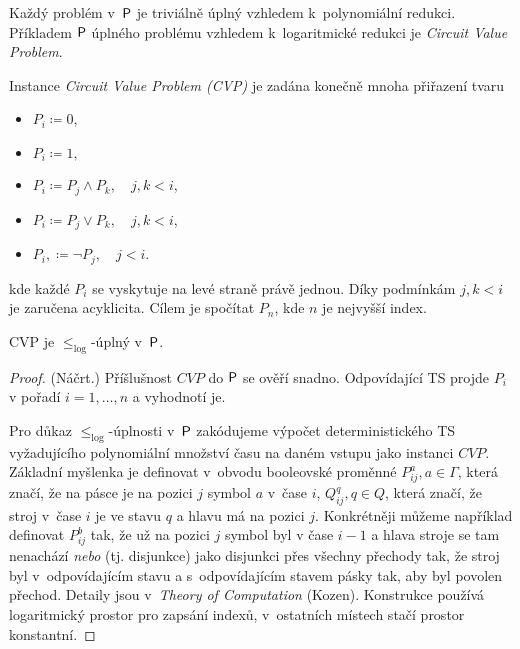 Každý problém v~$\P$ je triviálně úplný vzhledem k~polynomiální redukci.
Příkladem $\P$ úplného problému vzhledem k~logaritmické redukci je
{\em Circuit Value Problem}.

\begin{definition}
    Instance {\em Circuit Value Problem (CVP)}
    je zadána konečně mnoha přiřazení tvaru
    \begin{itemize}
        \item $P_i \coloneqq 0$,
        \item $P_i \coloneqq 1,$
        \item $P_i \coloneqq P_j \land P_k, \quad j, k < i$,
        \item $P_i \coloneqq P_j \lor P_k, \quad j, k < i$,
        \item $P_i, \coloneqq \neg P_j, \quad j < i$.
    \end{itemize}
    kde každé $P_i$ se vyskytuje na levé straně právě jednou. Díky
    podmínkám $j,k < i$ je zaručena acyklicita. Cílem je spočítat $P_n$,
    kde $n$ je nejvyšší index.
\end{definition}

\begin{theorem}
    CVP je $\leq_{\log}$-úplný v~$\P$.
\end{theorem}

\begin{proof} (Náčrt.)
    Příšlušnost $CVP$ do $\P$ se ověří snadno. Odpovídající TS projde
    $P_i$ v pořadí $i = 1,\ldots,n$ a vyhodnotí je.

    Pro důkaz $\leq_{\log}$-úplnosti v~$\P$ zakódujeme výpočet
    deterministického TS vyžadujícího polynomiální množství času na
    daném vstupu jako instanci $CVP$.
    Základní myšlenka je definovat v~obvodu booleovské proměnné
    $P^{a}_{ij}, a \in \Gamma$, která značí, že na pásce je na pozici
    $j$ symbol $a$ v~čase $i$,
    $Q^q_{ij}, q \in Q$, která značí, že stroj v~čase $i$ je ve stavu $q$
    a hlavu má na pozici $j$.
    Konkrétněji můžeme například definovat $P^{b}_{ij}$ tak,
    že už na pozici $j$ symbol byl v čase $i-1$ a hlava stroje se tam
    nenachází {\em nebo} (tj. disjunkce)
    jako disjunkci přes všechny přechody tak, že stroj byl
    v~odpovídajícím stavu a s~odpovídajícím stavem pásky tak, aby byl
    povolen přechod.
    Detaily jsou v~{\em Theory of Computation} (Kozen).
    Konstrukce používá logaritmický prostor pro zapsání indexů,
    v~ostatních místech stačí prostor konstantní.
\end{proof}

